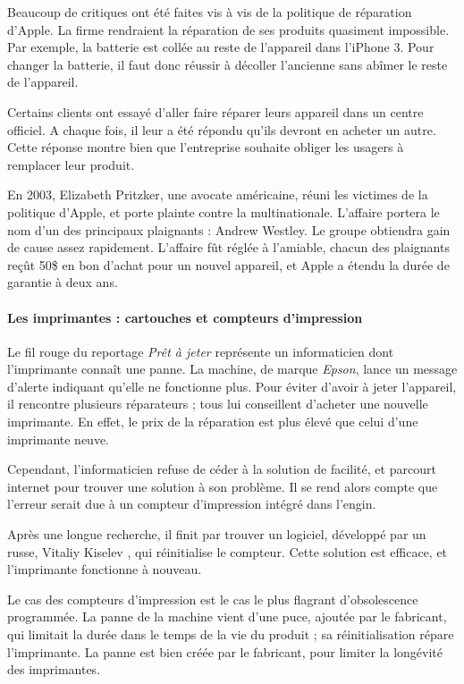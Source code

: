\smallbreak 

Beaucoup de critiques ont été faites vis à vis de la politique de réparation d'Apple. La firme  rendraient la réparation de ses produits quasiment impossible. Par exemple, la batterie est collée au reste de l'appareil dans l'iPhone 3. Pour changer la batterie, il faut donc réussir à décoller l'ancienne sans abîmer le reste de l'appareil.  

Certains clients ont essayé d'aller faire réparer leurs appareil dans un centre officiel. A chaque fois, il leur a été répondu qu'ils devront en acheter un autre. Cette réponse montre bien que l'entreprise souhaite obliger les usagers à remplacer leur produit. 

\smallbreak


En 2003, Elizabeth Pritzker, une avocate américaine, réuni les victimes de la politique d'Apple, et porte plainte contre la multinationale. L'affaire portera le nom d'un des principaux plaignants : Andrew Westley. Le groupe obtiendra gain de cause assez rapidement. L'affaire fût réglée à l'amiable, chacun des plaignants reçût 50\$ en bon d'achat pour un nouvel appareil, et Apple a étendu la durée de garantie à deux ans. 

\paragraph*{Les imprimantes : cartouches et compteurs d'impression}

Le fil rouge du reportage \textit{Prêt à jeter} représente un informaticien dont l'imprimante connaît une panne. La machine, de marque \textit{Epson}, lance un message d'alerte indiquant qu'elle ne fonctionne plus. Pour éviter d'avoir à jeter l'appareil, il rencontre plusieurs réparateurs ; tous lui conseillent d'acheter une nouvelle imprimante. En effet, le prix de la réparation est plus élevé que celui d'une imprimante neuve. 

Cependant, l'informaticien refuse de céder à la solution de facilité, et parcourt internet pour trouver une solution à son problème. Il se rend alors compte que l'erreur serait due à un compteur d'impression intégré dans l'engin. 

Après une longue recherche, il finit par trouver un logiciel, développé par un russe, Vitaliy Kiselev , qui réinitialise le compteur. Cette solution est efficace, et l'imprimante fonctionne à nouveau.


Le cas des compteurs d'impression est le cas le plus flagrant d'obsolescence programmée. La panne de la machine vient d'une puce, ajoutée par le fabricant, qui limitait la durée dans le temps de la vie du produit ; sa réinitialisation répare l'imprimante. La panne est bien créée par le fabricant, pour limiter la longévité  des imprimantes.

